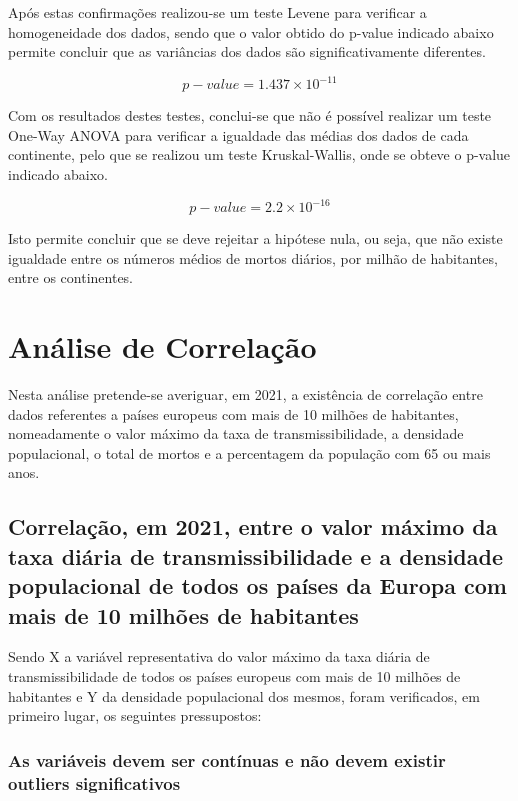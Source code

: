 \documentclass[conference]{IEEEtran}
\begin{document}
Após estas confirmações realizou-se um teste Levene para verificar a homogeneidade dos dados, sendo que o valor obtido do p-value indicado abaixo permite concluir que as variâncias dos dados são significativamente diferentes.

\begin{equation}
p-value = 1.437\times 10^{-11}\label{eq}
\end{equation}

Com os resultados destes testes, conclui-se que não é possível realizar um teste One-Way ANOVA para verificar a igualdade das médias dos dados de cada continente, pelo que se realizou um teste Kruskal-Wallis, onde se obteve o p-value indicado abaixo. 

\begin{equation}
p-value = 2.2\times 10^{-16}\label{eq}
\end{equation}

Isto permite concluir que se deve rejeitar a hipótese nula, ou seja, que não existe igualdade entre os números médios de mortos diários, por milhão de habitantes, entre os continentes.


\section{Análise de Correlação} %
Nesta análise pretende-se averiguar, em 2021, a existência de correlação entre dados referentes a países europeus com mais de 10 milhões de habitantes, nomeadamente o valor máximo da taxa de transmissibilidade, a densidade populacional, o total de mortos e a percentagem da população com 65 ou mais anos.

\subsection{Correlação, em 2021, entre o valor máximo da taxa diária de transmissibilidade e a densidade populacional de todos os países da Europa com mais de 10 milhões de habitantes}

Sendo X a variável representativa do valor máximo da taxa diária de transmissibilidade de todos os países europeus com mais de 10 milhões de habitantes e Y da densidade populacional dos mesmos, foram verificados, em primeiro lugar, os seguintes pressupostos:

\subsubsection{As variáveis devem ser contínuas e não devem existir outliers significativos}
\end{document}
